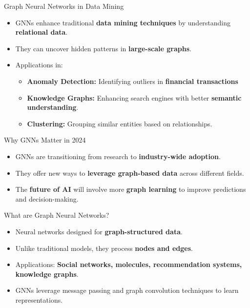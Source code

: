 \documentclass{beamer}
\begin{document}
\begin{frame}{Graph Neural Networks in Data Mining}
    \begin{itemize}
        \item GNNs enhance traditional \textbf{data mining techniques} by understanding \textbf{relational data}.
        \item They can uncover hidden patterns in \textbf{large-scale graphs}.
        \item Applications in:
        \begin{itemize}
            \item \textbf{Anomaly Detection:} Identifying outliers in \textbf{financial transactions}
            \item \textbf{Knowledge Graphs:} Enhancing search engines with better \textbf{semantic understanding}.
            \item \textbf{Clustering:} Grouping similar entities based on relationships.
        \end{itemize}
    \end{itemize}
\end{frame}

\begin{frame}{Why GNNs Matter in 2024}
    \begin{itemize}
        \item GNNs are transitioning from research to \textbf{industry-wide adoption}.
        \item They offer new ways to \textbf{leverage graph-based data} across different fields.
        \item The \textbf{future of AI} will involve more \textbf{graph learning} to improve predictions and decision-making.
    \end{itemize}
\end{frame}

\begin{frame}{What are Graph Neural Networks?}
    \begin{itemize}
        \item Neural networks designed for \textbf{graph-structured data}.
        \item Unlike traditional models, they process \textbf{nodes and edges}.
        \item Applications: \textbf{Social networks, molecules, recommendation systems, knowledge graphs}.
        \item GNNs leverage message passing and graph convolution techniques to learn representations.
    \end{itemize}
\end{frame}
\end{document}
